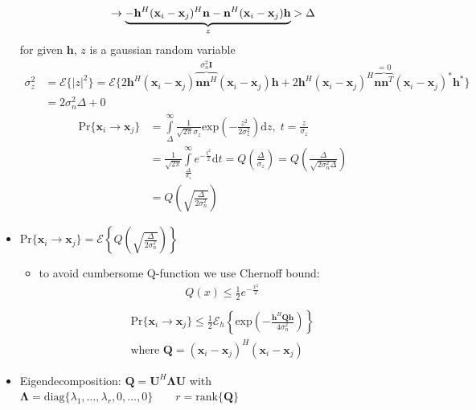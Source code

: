 \documentclass[a4paper, 10pt]{article}
\begin{document}
\begin{itemize}
\begin{align*}
	\end{align*}
	\begin{align*}
		\rightarrow \underbrace{\mathbf{-h^{\mathnormal{H}}(x_{\mathnormal{i}}-x_{\mathnormal{j}})^{\mathnormal{H}}n-n^{\mathnormal{H}}(x_{\mathnormal{i}}-x_{\mathnormal{j}})h}}_{z}>\Delta
	\end{align*}
for given $\mathbf{h}$, $z$ is a gaussian random variable
\begin{align*}
	\sigma_z^2&=\mathcal{E}\{|z|^2\}=\mathcal{E}\{2\mathbf{h}^H(\mathbf{x}_i-\mathbf{x}_j)\overbrace{\mathbf{nn}^H}^{\sigma_n^2\mathbf{I}}(\mathbf{x}_i-\mathbf{x}_j)\mathbf{h}
	+2\mathbf{h}^H(\mathbf{x}_i-\mathbf{x}_j)^H\overbrace{\mathbf{nn}^T}^{=0}(\mathbf{x}_i-\mathbf{x}_j)^*\mathbf{h}^*\}\\
		&=2\sigma_n^2\Delta+0
\end{align*}
\begin{align*}
	\mathrm{Pr}\{\mathbf{x}_i\rightarrow\mathbf{x}_j\}&=\int\limits_{\Delta}^{\infty}\frac{1}{\sqrt{2\pi}\sigma_z}\mathrm{exp}\left(-\frac{z^2}{2\sigma_z^2}\right)\mathrm{d}z, \; t=\frac{z}{\sigma_z}\\
	&=\frac{1}{\sqrt{2\pi}}\int\limits_{\frac{\Delta}{\sigma_z}}^{\infty}e^{-\frac{t^2}{2}}\mathrm{d}t=Q\left(\frac{\Delta}{\sigma_z}\right)=Q\left(\frac{\Delta}{\sqrt{2\sigma_n^2\Delta}}\right)\\
	&=Q\left(\sqrt{\frac{\Delta}{2\sigma_n^2}}\right)
\end{align*}
	\item $\mathrm{Pr}\{\mathbf{x}_i\rightarrow\mathbf{x}_j\}=\mathcal{E}\left\{Q\left(\sqrt{\frac{\Delta}{2\sigma_n^2}}\right)\right\}$
	\begin{itemize}
	\item to avoid cumbersome Q-function we use Chernoff bound:
	\begin{align*}	
		\boxed{Q(x)\leq\frac{1}{2}e^{-\frac{x^2}{2}}}\\
	\end{align*}
	\begin{align*}
		\mathrm{Pr}\{\mathbf{x}_i\rightarrow\mathbf{x}_j\}\leq \frac{1}{2}\mathcal{E}_h\left\{\mathrm{exp}\left(-\frac{\mathbf{h}^H\mathbf{Qh}}{4\sigma_n^2}\right)\right\}\\
		\text{where } \mathbf{Q}=(\mathbf{x}_i-\mathbf{x}_j)^H(\mathbf{x}_i-\mathbf{x}_j)
	\end{align*}
	\end{itemize}
	\item Eigendecomposition: $\mathbf{Q=U}^H\mathbf{\Lambda U}$ with $\mathbf{\Lambda} = \mathrm{diag}\{\lambda_1,\dots,\lambda_r, 0,\dots,0\}\qquad r=\mathrm{rank}\{\mathbf{Q}\}$\\


\end{itemize}
\end{document}

